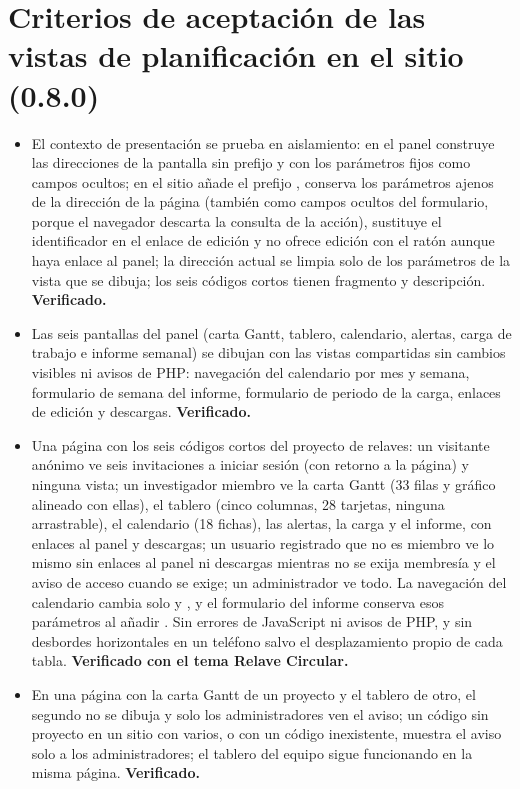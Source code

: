 \documentclass[11pt,a4paper]{article}
\begin{document}
\section{Criterios de aceptación de las vistas de planificación en el sitio (0.8.0)}

\begin{itemize}
\item El contexto de presentación se prueba en aislamiento: en el panel construye las direcciones de la pantalla sin prefijo y con los parámetros fijos como campos ocultos; en el sitio añade el prefijo , conserva los parámetros ajenos de la dirección de la página (también como campos ocultos del formulario, porque el navegador descarta la consulta de la acción), sustituye el identificador en el enlace de edición y no ofrece edición con el ratón aunque haya enlace al panel; la dirección actual se limpia solo de los parámetros de la vista que se dibuja; los seis códigos cortos tienen fragmento y descripción. \textbf{Verificado.}
\item Las seis pantallas del panel (carta Gantt, tablero, calendario, alertas, carga de trabajo e informe semanal) se dibujan con las vistas compartidas sin cambios visibles ni avisos de PHP: navegación del calendario por mes y semana, formulario de semana del informe, formulario de periodo de la carga, enlaces de edición y descargas. \textbf{Verificado.}
\item Una página con los seis códigos cortos del proyecto de relaves: un visitante anónimo ve seis invitaciones a iniciar sesión (con retorno a la página) y ninguna vista; un investigador miembro ve la carta Gantt (33 filas y gráfico alineado con ellas), el tablero (cinco columnas, 28 tarjetas, ninguna arrastrable), el calendario (18 fichas), las alertas, la carga y el informe, con enlaces al panel y descargas; un usuario registrado que no es miembro ve lo mismo sin enlaces al panel ni descargas mientras no se exija membresía y el aviso de acceso cuando se exige; un administrador ve todo. La navegación del calendario cambia solo  y , y el formulario del informe conserva esos parámetros al añadir . Sin errores de JavaScript ni avisos de PHP, y sin desbordes horizontales en un teléfono salvo el desplazamiento propio de cada tabla. \textbf{Verificado con el tema Relave Circular.}
\item En una página con la carta Gantt de un proyecto y el tablero de otro, el segundo no se dibuja y solo los administradores ven el aviso; un código sin proyecto en un sitio con varios, o con un código inexistente, muestra el aviso solo a los administradores; el tablero del equipo sigue funcionando en la misma página. \textbf{Verificado.}
\end{itemize}
\end{document}

